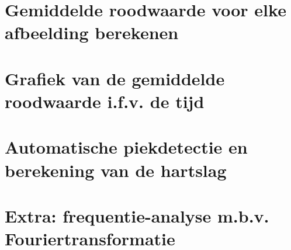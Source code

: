 \section{Gemiddelde roodwaarde voor elke afbeelding berekenen}
\label{sec:Mod5_Sec3}
%

\section{Grafiek van de gemiddelde roodwaarde i.f.v. de tijd}
\label{sec:Mod5_Sec4}
%

\section{Automatische piekdetectie en berekening van de hartslag}
\label{sec:Mod5_Sec5}
%

\section{Extra: frequentie-analyse m.b.v. Fouriertransformatie}
\label{sec:Mod5_Sec6}
%

